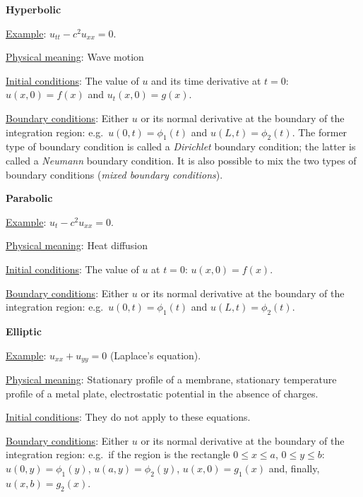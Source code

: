 \centerline{\bf Hyperbolic}

\noindent \underline{Example}: $u_{t t} - c^2 u_{xx} = 0$.

\noindent \underline{Physical meaning}: Wave motion

\noindent \underline{Initial conditions}: The value of $u$ and its
time derivative at $t=0$: $u(x,0)=f(x)$ and $u_t(x,0)=g(x)$.

\noindent \underline{Boundary conditions}: Either $u$ or its normal
derivative at the boundary of the integration region: e.g.\ $u(0,t) =
\phi_1(t)$ and $u(L,t)= \phi_2(t)$.  The former type of boundary
condition is called a \textit{Dirichlet} boundary condition; the
latter is called a \textit{Neumann} boundary condition.  It is also
possible to mix the two types of boundary conditions (\textit{mixed
  boundary conditions}).

\bigskip

\centerline{\bf Parabolic}

\noindent \underline{Example}: $u_{t} - c^2 u_{xx} = 0$.

\noindent \underline{Physical meaning}: Heat diffusion

\noindent \underline{Initial conditions}: The value of $u$ at $t=0$:
$u(x,0)=f(x)$.

\noindent \underline{Boundary conditions}: Either $u$ or its normal
derivative at the boundary of the integration region: e.g.\ $u(0,t) =
\phi_1(t)$ and $u(L,t)= \phi_2(t)$.

\bigskip

\centerline{\bf Elliptic}

\noindent \underline{Example}: $u_{xx} + u_{y y} = 0$ (Laplace's
equation).

\noindent \underline{Physical meaning}: Stationary profile of a
membrane, stationary temperature profile of a metal plate,
electrostatic potential in the absence of charges.

\noindent \underline{Initial conditions}: They do not apply to these
equations.

\noindent \underline{Boundary conditions}: Either $u$ or its normal
derivative at the boundary of the integration region: e.g.\ if the
region is the rectangle $0 \le x \le a$, $0 \le y \le b$: $u(0,y) =
\phi_1(y)$, $u(a,y)= \phi_2(y)$, $u(x,0) = g_1(x)$ and, finally,
$u(x,b)=g_2(x)$.


